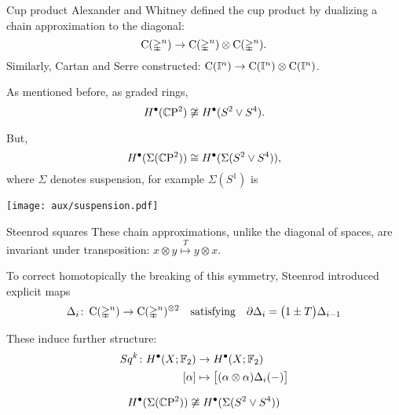 
\begin{frame}[fragile]{Cup product}
	\pause Alexander and Whitney defined the cup product by dualizing a chain approximation to the diagonal:
	\[
	\operatorname{C}(\mathbb{\Delta}^n) \to \operatorname{C}(\mathbb{\Delta}^n) \otimes \operatorname{C}(\mathbb{\Delta}^n).
	\]
	\pause Similarly, Cartan and Serre constructed: $\operatorname{C}(\mathbb{I}^n) \to \operatorname{C}(\mathbb{I}^n) \otimes \operatorname{C}(\mathbb{I}^n)$.

	\bigskip\pause
	As mentioned before, as graded rings,
	\[
	H^\bullet(\mathbb{C} \mathrm{P}^2) \not\cong H^\bullet(S^2 \vee S^4).
	\]

	\vskip -8pt \pause But,
	\[
	H^\bullet(\Sigma(\mathbb{C} \mathrm{P}^2)) \cong H^\bullet(\Sigma(S^2 \vee S^4)),
	\]
	where $\Sigma$ denotes suspension, for example $\Sigma(S^1)$ is
	\begin{center}
		\texttt{[image: aux/suspension.pdf]}
	\end{center}
\end{frame}

\begin{frame}{Steenrod squares}
	\pause These chain approximations, unlike the diagonal of spaces, are  invariant under transposition: $x \otimes y \stackrel{T}{\mapsto} y \otimes x$.
	\begin{center}
	\end{center}

	\smallskip\pause To correct homotopically the breaking of this symmetry, Steenrod introduced explicit maps
	\[
	\Delta_i \colon \operatorname{C}(\mathbb{\Delta}^n) \to \operatorname{C}(\mathbb{\Delta}^n)^{\otimes 2}
	\quad \text{satisfying} \quad
	\partial \Delta_{i} = \big(1 \pm T \big) \Delta_{i-1}
	\]

	\pause

	These induce further structure:
	\[
	\begin{split}
		Sq^k \colon H^\bullet(X; {\mathbb{F}_2}) &\to H^\bullet(X; {\mathbb{F}_2}) \\
		[\alpha] &\mapsto \big[ (\alpha \otimes \alpha) \Delta_i(-) \big]
	\end{split}
	\]

	\vskip-8pt\pause

	\[
	H^\bullet(\Sigma(\mathbb{C} \mathrm{P}^2)) \not\cong H^\bullet(\Sigma(S^2 \vee S^4))
	\]
\end{frame}

